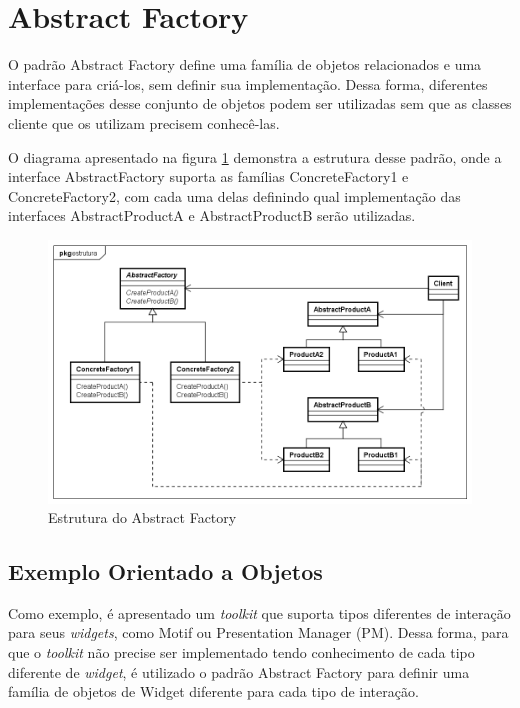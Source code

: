 \section{Abstract Factory}

O padrão Abstract Factory define uma família 
de objetos relacionados e uma interface para 
criá-los, sem definir sua implementação. Dessa 
forma, diferentes implementações desse 
conjunto de objetos podem ser utilizadas 
sem que as classes cliente que os utilizam 
precisem conhecê-las.\cite{gamma:1995}

O diagrama apresentado na figura \ref{abfactory_struct} 
demonstra a estrutura desse padrão, onde a 
interface AbstractFactory suporta as famílias 
ConcreteFactory1 e ConcreteFactory2, com cada uma 
delas definindo qual implementação das interfaces 
AbstractProductA e AbstractProductB serão 
utilizadas.

\begin{figure}[htb]
	\caption{\label{abfactory_struct}Estrutura do Abstract Factory}
	\begin{center}
	    \includegraphics[scale=0.5]{5_padroes-contexto-funcional/5.1_criacionais/5.1.2_abstract-factory/abstractfactory_estrutura.png}
	\end{center}
\end{figure}

\subsection*{Exemplo Orientado a Objetos}

Como exemplo, é apresentado um \textit{toolkit} 
que suporta tipos diferentes de interação para 
seus \textit{widgets}, como Motif ou Presentation 
Manager (PM). Dessa forma, para que o \textit{toolkit} 
não precise ser implementado tendo conhecimento 
de cada tipo diferente de \textit{widget}, é 
utilizado o padrão Abstract Factory para 
definir uma família de objetos de Widget 
diferente para cada tipo de interação. 

